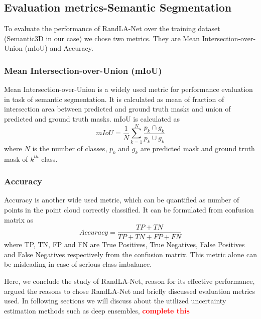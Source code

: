 \subsection{Evaluation metrics-Semantic Segmentation}
To evaluate the performance of RandLA-Net over the training dataset (Semantic3D in our case) we chose two metrics.
They are Mean Intersection-over-Union (mIoU) and Accuracy.

\subsubsection{Mean Intersection-over-Union (mIoU)}
Mean Intersection-over-Union is a widely used metric for performance evaluation in task of semantic segmentation.
It is calculated as mean of fraction of intersection area between predicted and ground truth masks and union of predicted and ground truth masks.
mIoU is calculated as
$$mIoU=\frac{1}{N}\sum_{k=1}^N \frac{p_k\cap g_k}{p_k \cup g_k}$$
where $N$ is the number of classes, $p_k$ and $g_k$ are predicted mask and ground truth mask of $k^{th}$ class.

\subsubsection{Accuracy}
Accuracy is another wide used metric, which can be quantified as number of points in the point cloud correctly classified.
It can be formulated from confusion matrix as
$$Accuracy = \frac{TP+TN}{TP+TN+FP+FN}$$
where TP, TN, FP and FN are True Positives, True Negatives, False Positives and False Negatives respectively from the confusion matrix.
This metric alone can be misleading in case of serious class imbalance.

Here, we conclude the study of RandLA-Net, reason for its effective performance, argued the reasons to chose RandLA-Net and briefly discussed evaluation metrics used.
In following sections we will discuss about the utilized uncertainty estimation methods such as deep ensembles, \textcolor{red}{\textbf{complete this}}

